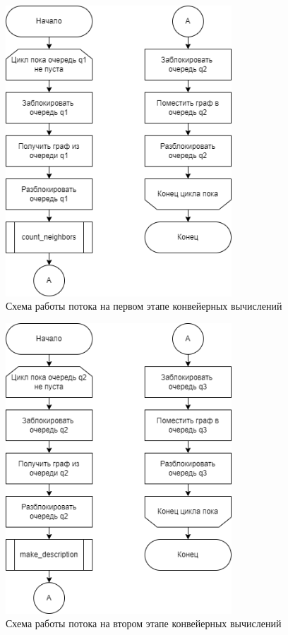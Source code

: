 \begin{figure}[h!btp]
	\centering
	\includegraphics[width=240pt]{inc/parallel_1.png}
	\caption{Схема работы потока на первом этапе конвейерных вычислений}
	\label{fig:parallel_1}	
\end{figure}

\clearpage

\begin{figure}[h!btp]
	\centering
	\includegraphics[width=240pt]{inc/parallel_2.png}
	\caption{Схема работы потока на втором этапе конвейерных вычислений}
	\label{fig:parallel_2}	
\end{figure}

